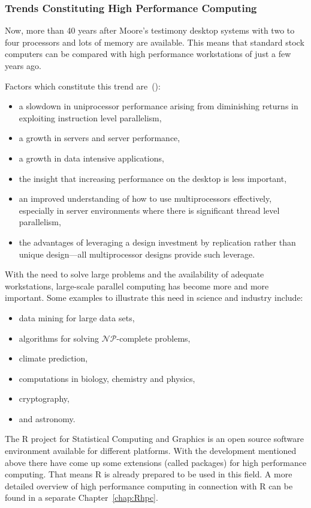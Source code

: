 \subsubsection{Trends Constituting High Performance Computing}
Now, more than 40 years after Moore's testimony desktop systems
with two to four 
processors and lots of memory are available. This means that standard
stock computers can be compared with high performance workstations of
just a few years ago.

Factors which constitute this trend are~(\cite{C1quant07}):
\begin{itemize}
\item a slowdown in uniprocessor performance arising from diminishing
  returns in exploiting instruction level parallelism,
\item a growth in servers and server performance,
\item a growth in data intensive applications,
\item the insight that increasing performance on the desktop is less
  important,
\item an improved understanding of how to use multiprocessors
  effectively, especially in server environments where there is
  significant thread level parallelism,
\item the advantages of leveraging a design investment by replication
  rather than unique design---all multiprocessor designs provide such leverage.
\end{itemize}

With the need to solve large problems and the availability of adequate
workstations, large-scale parallel computing has become more and more
important. Some examples to illustrate this need in science and
industry include:

\begin{itemize}
\item data mining for large data sets,
\item algorithms for solving $\mathcal{NP}$-complete problems,
\item climate prediction,
\item computations in biology, chemistry and physics,
\item cryptography,
\item and astronomy.
\end{itemize}

The R project for Statistical Computing and Graphics is an open source
software environment available for different
platforms. With the 
development mentioned above there have come up some extensions (called
packages) for high performance computing. That means R is already
prepared to be used in this field. A more detailed overview of high
performance computing in connection with R can be found in a separate
Chapter~\ref{chap:Rhpc}.


